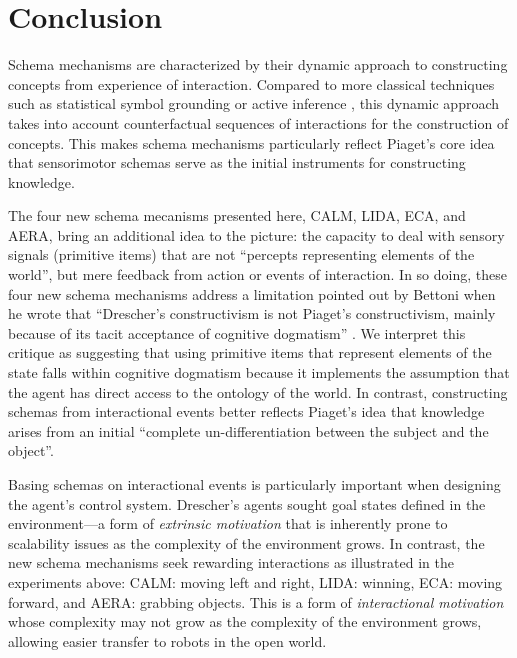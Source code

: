 \documentclass[runningheads]{llncs}
\begin{document}

\section{Conclusion}

Schema mechanisms are characterized by their dynamic approach to constructing concepts from experience of interaction.
Compared to more classical techniques such as statistical symbol grounding \cite{harnad_symbol_1990} or active inference \cite{friston_active_2017}, this dynamic approach takes into account counterfactual sequences of interactions for the construction of concepts. 
This makes schema mechanisms particularly reflect Piaget's core idea that sensorimotor schemas serve as the initial instruments for constructing knowledge. 

The four new schema mecanisms presented here, CALM, LIDA, ECA, and AERA, bring an additional  idea to the picture: the capacity to deal with sensory signals (primitive items) that are not ``percepts representing elements of the world'', but mere feedback from action or events of interaction.  
In so doing, these four new schema mechanisms address a limitation pointed out by Bettoni when he wrote that 
``Drescher's constructivism is not Piaget's constructivism, mainly because of its tacit acceptance of cognitive dogmatism'' \cite[p. 6]{bettoni_made-up_1993}.
We interpret this critique as suggesting that using primitive items that represent elements of the state falls within cognitive dogmatism because it implements the assumption that the agent has direct access to the ontology of the world.
In contrast, constructing schemas from interactional events better reflects Piaget's idea that knowledge arises from an
initial ``complete un-differentiation between the subject and the object''. 


Basing schemas on interactional events is particularly important when designing the agent's control system. 
Drescher's agents sought goal states defined in the environment---a form of \textit{extrinsic motivation} 
that is inherently prone to scalability issues as the complexity of the environment grows.
In contrast, the new schema mechanisms seek rewarding interactions as illustrated in the experiments above: CALM: moving left and right, LIDA: winning, ECA: moving forward, and AERA: grabbing objects. 
This is a form of \textit{interactional motivation} \cite{georgeon_interactional_2012} whose complexity may not grow as the complexity of the environment grows, allowing easier transfer to robots in the open world.
\end{document}
